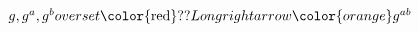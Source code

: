 \documentclass[preview]{standalone}
\begin{document}
\begin{center}
$g, g^a, g^b \\overset{\text\color{red}??}{\\Longrightarrow} {\color{orange}g^{ab}}$
\end{center}
\end{document}
